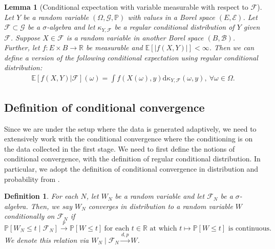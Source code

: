 \documentclass[12pt]{article}
\newtheorem{lemma}{Lemma}
\newtheorem{definition}{Definition}
\def\P{\mathbb{P}}
\def\P{\mathbb{P}}
\newcommand{\E}{\mathbb E}								%
\renewcommand{\P}{\mathbb{P}}							%
\newcommand{\R}{\mathbb{R}}								%
\newcommand{\convp}{\overset p \rightarrow}             %
\newcommand{\convdp}{\overset {d,p} \longrightarrow}    %
\begin{document}
\begin{lemma}[Conditional expectation with variable measurable with respect to $\mathcal{F}$]\label{lem:new_klenke_thm_8.38}
	Let $Y$ be a random variable $(\Omega,\mathcal{G},\mathbb{P})$ with values in a Borel space $(E,\mathcal{E})$. Let $\mathcal{F}\subset \mathcal{G}$ be a $\sigma$-algebra and let $\kappa_{Y,\mathcal{F}}$ be a regular conditional distribution of $Y$ given $\mathcal{F}$. Suppose $X\in\mathcal{F}$ is a random variable in another Borel space $(B,\mathcal{B})$. Further, let $f:E\times B\rightarrow\mathbb{R}$ be measurable and $\E[|f(X, Y)|]<\infty$. Then we can define a version of the following conditional expectation using regular conditional distribution:
  \begin{align*}
    \E[f(X, Y)|\mathcal{F}](\omega)=\int f(X(\omega),y)\mathrm{d}\kappa_{Y,\mathcal{F}}(\omega,y),\ \forall \omega\in\Omega.
  \end{align*}
\end{lemma}

\subsection{Definition of conditional convergence}



Since we are under the setup where the data is generated adaptively, we need to extensively work with the conditional convergence where the conditioning is on the data collected in the first stage. We need to first define the notions of conditional convergence, with the definition of regular conditional distribution. In particular, we adopt the definition of conditional convergence in distribution and probability from \citet{niu2024reconciling}.


\begin{definition} \label{def:conditional-convergence-distribution}
    For each $N$, let $W_N$ be a random variable and let $\mathcal F_N$ be a $\sigma$-algebra. Then, we say $W_N$ converges in distribution to a random variable $W$ conditionally on $\mathcal F_N$ if
    \begin{equation}
        \P[W_N \leq t \mid \mathcal F_N] \convp \P[W \leq t] \ \text{for each } t \in \R \text{ at which } t \mapsto \P[W \leq t] \text{ is continuous.}
    \end{equation}
    We denote this relation via $W_N \mid \mathcal F_N \convdp W$.
\end{definition}
\end{document}
